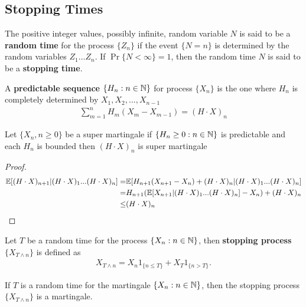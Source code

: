 \documentclass[a4paper,10pt,english]{article}
\begin{document}
\subsection{Stopping Times}
\begin{defn}The positive integer values, possibly infinite, random variable $N$ is said to be a \textbf{random time} for the process $\{Z_n\}$ if the event $\{N=n\}$ is determined by the random variables $Z_1 \hdots Z_n$. If $\Pr\{N < \infty\}=1$, then the random time $N$ is said to be a \textbf{stopping time}. 
\end{defn}
\begin{defn}A \textbf{predictable sequence} $\{H_n:n\in \mathbb{N}\}$ for process $\{X_n\}$ is the one where $H_n$ is completely determined by $X_1,X_2,...,X_{n-1}$
\begin{align*}
    \sum_{m=1}^{n}H_m(X_m-X_{m-1})=(H\cdot X)_n
\end{align*}
\end{defn}
\begin{thm}
Let $\{X_n,n\geq 0\}$ be a super martingale if $\{H_n \geq 0: n \in \mathbb{N}\}$ is predictable and each $H_n$ is bounded then $(H \cdot X)_n$ is  super martingale
\end{thm}
\begin{proof}
\begin{align*}
\mathbb{E}[(H\cdot X)_{n+1}|(H\cdot X)_1 ... (H \cdot X)_n]=&\mathbb{E}[H_{n+1}(X_{n+1}-X_n)+(H\cdot X)_n|(H\cdot X)_1 ... (H \cdot X)_n]\\
=&H_{n+1}(\mathbb{E}[X_{n+1}|(H\cdot X)_1 ... (H \cdot X)_n]-X_n)+(H\cdot X)_n\\
\leq&(H\cdot X)_n
\end{align*}
\end{proof}
\begin{defn}
Let $T$ be a random time for the process $\{X_n:n\in \mathbb{N}\}$, then \textbf{stopping  process} $\{X_{T\wedge n}\}$ is defined as 
\begin{align*}
X_{T\wedge n} = X_n1_{\{n \leq T\}} + X_T1_{\{n > T\}}.
\end{align*}
\end{defn}
\begin{prop}
If $T$ is a random time for the martingale $\{X_n:n\in \mathbb{N}\}$, then the stopping process $\{X_{T\wedge n}\}$ is a martingale.
\end{prop}
\end{document}
